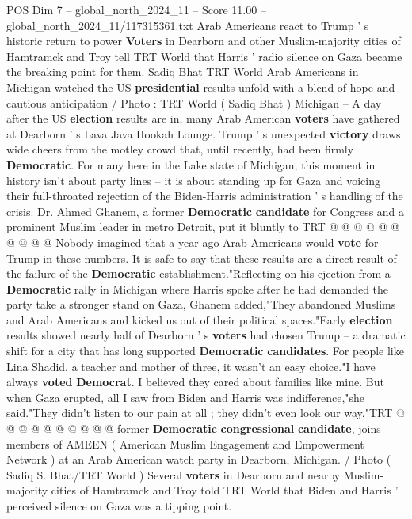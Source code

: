 \begin{textsample}{POS Dim 7 – global\_north\_2024\_11 – Score 11.00 – global\_north\_2024\_11/117315361.txt}  \label{ex:f7_pos_113}
Arab Americans react to Trump ' s historic return to power \textbf{Voters} in Dearborn and other Muslim-majority cities of Hamtramck and Troy tell TRT World that Harris ' radio silence on Gaza became the breaking point for them.
Sadiq Bhat TRT World Arab Americans in Michigan watched the US \textbf{presidential} results unfold with a blend of hope and cautious anticipation / Photo : TRT World ( Sadiq Bhat ) Michigan -- A day after the US \textbf{election} results are in, many Arab American \textbf{voters} have gathered at Dearborn ' s Lava Java Hookah Lounge.
Trump ' s unexpected \textbf{victory} draws wide cheers from the motley crowd that, until recently, had been firmly \textbf{Democratic}.
For many here in the Lake state of Michigan, this moment in history isn't about party lines -- it is about standing up for Gaza and voicing their full-throated rejection of the Biden-Harris administration ' s handling of the crisis.
Dr.
Ahmed Ghanem, a former \textbf{Democratic} \textbf{candidate} for Congress and a prominent Muslim leader in metro Detroit, put it bluntly to TRT @ @ @ @ @ @ @ @ @ @ Nobody imagined that a year ago Arab Americans would \textbf{vote} for Trump in these numbers.
It is safe to say that these results are a direct result of the failure of the \textbf{Democratic} establishment."Reflecting on his ejection from a \textbf{Democratic} rally in Michigan where Harris spoke after he had demanded the party take a stronger stand on Gaza, Ghanem added,"They abandoned Muslims and Arab Americans and kicked us out of their political spaces."Early \textbf{election} results showed nearly half of Dearborn ' s \textbf{voters} had chosen Trump -- a dramatic shift for a city that has long supported \textbf{Democratic} \textbf{candidates}.
For people like Lina Shadid, a teacher and mother of three, it wasn't an easy choice."I have always \textbf{voted} \textbf{Democrat}.
I believed they cared about families like mine.
But when Gaza erupted, all I saw from Biden and Harris was indifference,"she said."They didn't listen to our pain at all ; they didn't even look our way."TRT @ @ @ @ @ @ @ @ @ @ former \textbf{Democratic} \textbf{congressional} \textbf{candidate}, joins members of AMEEN ( American Muslim Engagement and Empowerment Network ) at an Arab American watch party in Dearborn, Michigan. / Photo ( Sadiq S.
Bhat/TRT World ) Several \textbf{voters} in Dearborn and nearby Muslim-majority cities of Hamtramck and Troy told TRT World that Biden and Harris ' perceived silence on Gaza was a tipping point.

\end{textsample}
